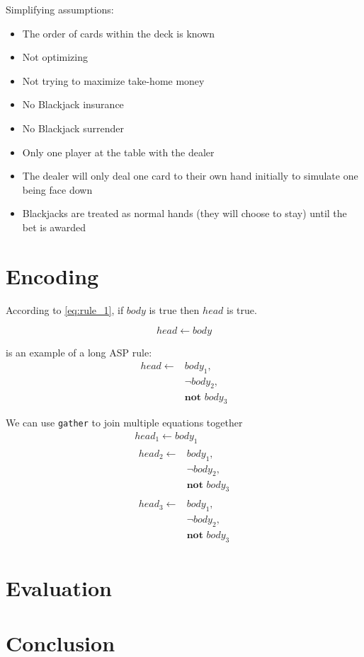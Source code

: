 \documentclass{article}
\begin{document}
Simplifying assumptions:

\begin{itemize}
    \item The order of cards within the deck is known
    \item Not optimizing
    \item Not trying to maximize take-home money
    \item No Blackjack insurance
    \item No Blackjack surrender
    \item Only one player at the table with the dealer
    \item The dealer will only deal one card to their own hand initially to simulate one being face down
    \item Blackjacks are treated as normal hands (they will choose to stay) until the bet is awarded
\end{itemize}

\section{Encoding}

According to \cref{eq:rule_1}, if $body$ is true then $head$ is true.

\begin{equation}
    \label{eq:rule_1}
    head \leftarrow body
\end{equation}

 is an example of a long ASP rule:
\begin{equation}
\begin{split}
    \label{eq:rule_2}
    head \leftarrow
        & body_1, \\
        & \neg body_2, \\
        & \textbf{not } body_3
\end{split}
\end{equation}

We can use \texttt{gather} to join multiple equations together
\begin{gather}
    \label{eq:rule_3}
    head_1 \leftarrow body_1 \\
    \begin{split}
        \label{eq:rule_4}
        head_2 \leftarrow
            & body_1, \\
            & \neg body_2, \\
            & \textbf{not } body_3
    \end{split} \\
    \begin{split}
        \label{eq:rule_5}
        head_3 \leftarrow
            & body_1, \\
            & \neg body_2, \\
            & \textbf{not } body_3
    \end{split}
\end{gather}

\section{Evaluation}

\section{Conclusion}

\newpage


\end{document}
